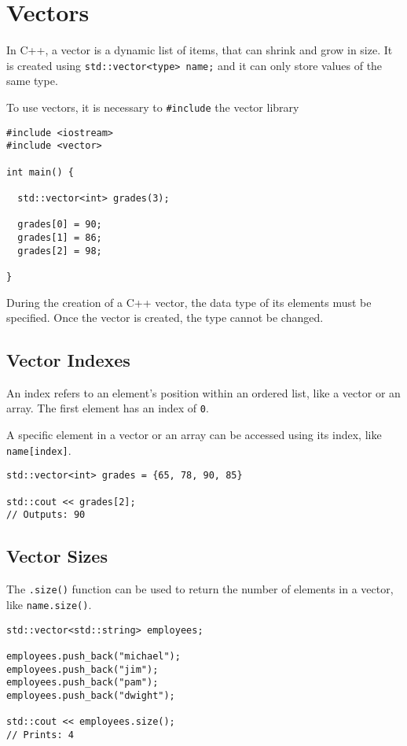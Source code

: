 \chapter{Vectors}
In C++, a vector is a dynamic list of items, that can shrink and grow in size. 
It is created using \verb!std::vector<type> name;! and it can only store values of the same type.

To use vectors, it is necessary to \verb!#include! the vector library

\begin{verbatim}
#include <iostream>
#include <vector>
 
int main() {
  
  std::vector<int> grades(3);
  
  grades[0] = 90;
  grades[1] = 86;
  grades[2] = 98;
  
}    
\end{verbatim}
During the creation of a C++ vector, the data type of its elements must be specified. 
Once the vector is created, the type cannot be changed.


\section{Vector Indexes}
An index refers to an element’s position within an ordered list, like a vector or an array. The first element has an index of \verb!0!.

A specific element in a vector or an array can be accessed using its index, like \verb!name[index]!.

\begin{verbatim}
std::vector<int> grades = {65, 78, 90, 85}

std::cout << grades[2];
// Outputs: 90    
\end{verbatim}

\section{Vector Sizes} 
The \verb!.size()! function can be used to return the number of elements in a vector, like \verb!name.size()!.

\begin{verbatim}
std::vector<std::string> employees;
 
employees.push_back("michael");
employees.push_back("jim");
employees.push_back("pam");
employees.push_back("dwight");
 
std::cout << employees.size();
// Prints: 4    
\end{verbatim}



